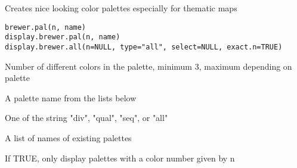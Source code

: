 \begin{Description}\relax
Creates nice looking color palettes especially for thematic maps
\end{Description}
\begin{Usage}
\begin{verbatim}brewer.pal(n, name)
display.brewer.pal(n, name)
display.brewer.all(n=NULL, type="all", select=NULL, exact.n=TRUE)
\end{verbatim}
\end{Usage}
\begin{Arguments}
\begin{ldescription}
\item[\code{n}] Number of different colors in the palette, minimum 3, maximum depending on palette
\item[\code{name}] A palette name from the lists below
\item[\code{type}] One of the string "div", "qual", "seq", or "all" 
\item[\code{select}] A list of names of existing palettes
\item[\code{exact.n}] If TRUE, only display palettes with a color number given by n
\end{ldescription}
\end{Arguments}
